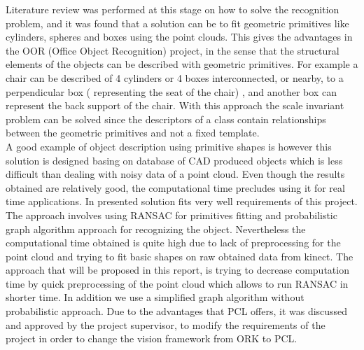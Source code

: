 \documentclass[fontsize=12pt]{article}
\begin{document}
Literature review was performed at this stage on  how to solve the recognition problem, and it was found that a solution can be to fit geometric primitives like cylinders, spheres and boxes using the point clouds. This gives the advantages in the OOR (Office Object Recognition) project, in the sense that the structural elements of the objects can be described with geometric primitives. For example a chair can be described of 4 cylinders or 4 boxes interconnected, or nearby, to a perpendicular box ( representing the seat of the chair) , and another box can represent the  back support of the chair. With this approach the scale invariant problem can be solved since the descriptors of a class contain relationships between the geometric primitives and not a fixed template. \\

A good example of object description using primitive shapes is \cite{pap2} however this solution is designed basing on database of CAD produced objects which is less difficult than dealing with noisy data of a point cloud. Even though the results obtained are relatively good, the computational time precludes using it for real time applications. In \cite{pap1} presented solution fits very well requirements of this project. The approach involves using RANSAC for primitives fitting and probabilistic graph algorithm approach for recognizing the object. Nevertheless the computational time obtained is quite high due to lack of preprocessing for the point cloud and trying to fit basic shapes on raw obtained data from kinect. The approach that will be proposed in this report,  is trying to decrease computation time by quick preprocessing of the point cloud which allows to run RANSAC in shorter time. In addition we use a simplified graph algorithm without probabilistic approach. Due to the advantages that PCL offers, it was discussed and approved by the project supervisor, to modify the requirements of the project in order to change the vision framework from ORK to PCL. 
\end{document}

